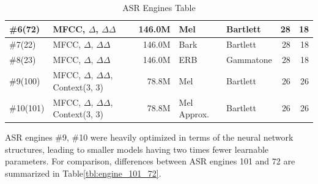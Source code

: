 \begin{table}[H]
\begin{tabular}{ !{\color{ytblborder}\vrule}l!{\color{ytblborder}\vrule}lrllrr| }
    \hline
      \#6(72)  
        & MFCC, \(\Delta\), \(\Delta\Delta\) 
        & 146.0M
        & Mel 
        & Bartlett
        & 28 
        & 18 \\
    \hline

    \hline
      \#7(22)  
        & MFCC, \(\Delta\), \(\Delta\Delta\) 
        & 146.0M
        & Bark 
        & Bartlett
        & 28 
        & 18 \\
    \hline

    \hline
      \#8(23)  
        & MFCC, \(\Delta\), \(\Delta\Delta\) 
        & 146.0M
        & ERB
        & Gammatone
        & 28 
        & 18 \\
    \hline

    \hline
      \#9(100)  
        & MFCC, \(\Delta\), \(\Delta\Delta\), Context(3, 3)
        & 78.8M
        & Mel 
        & Bartlett
        & 26 
        & 26 \\
    \hline

    \hline
      \#10(101)
        & MFCC, \(\Delta\), \(\Delta\Delta\), Context(3, 3)
        & 78.8M
        & Mel Approx.
        & Bartlett
        & 26 
        & 26 \\
    \hline

    \hline
\end{tabular}
\caption{ASR Engines Table}
\label{tbl:asr_engines}
\end{table}
\vspace{-0.7cm}
ASR engines \#9, \#10 were heavily 
optimized in terms of the neural network structures, 
leading to smaller models having two times fewer learnable parameters.
For comparison, differences between ASR engines 101
and 72 are summarized in
Table\;\ref{tbl:engine_101_72}.
